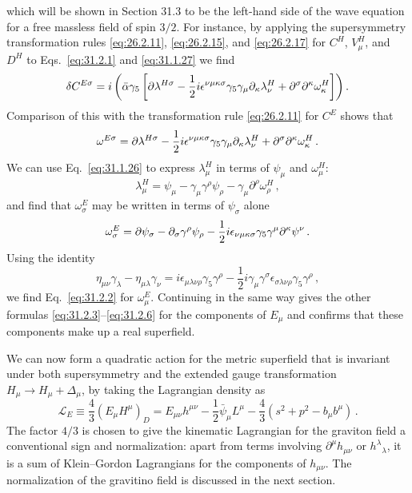 which will be shown in Section 31.3 to be the left-hand side of the wave
equation for a free massless field of spin \(3/2\). For instance, by applying
the supersymmetry transformation rules \eqref{eq:26.2.11},
\eqref{eq:26.2.15}, and \eqref{eq:26.2.17} for \(C^H\), \(V_\mu^H\), and
\(D^H\) to Eqs.~\eqref{eq:31.2.1} and \eqref{eq:31.1.27} we find
\[
  \delta C^{E\sigma}
  =i\left(
    \bar\alpha\gamma_5
    \left[
      \sl{\partial}\lambda^{H\sigma}
      -\frac12i\epsilon^{\nu\mu\kappa\sigma}
       \gamma_5\gamma_\mu\partial_\kappa\lambda_\nu^H
      +\partial^\sigma\partial^\kappa\omega_\kappa^H
    \right]
  \right).
\]
Comparison of this with the transformation rule \eqref{eq:26.2.11} for
\(C^E\) shows that
\[
  \omega^{E\sigma}
  =\sl{\partial}\lambda^{H\sigma}
   -\frac12i\epsilon^{\nu\mu\kappa\sigma}
    \gamma_5\gamma_\mu\partial_\kappa\lambda_\nu^H
   +\partial^\sigma\partial^\kappa\omega_\kappa^H\,.
\]
We can use Eq.~\eqref{eq:31.1.26} to express \(\lambda_\mu^H\) in terms of
\(\psi_\mu\) and \(\omega_\mu^H\):
\[
  \lambda_\mu^H
  =\psi_\mu-\gamma_\mu\gamma^\rho\psi_\rho
   -\gamma_\mu\partial^\rho\omega_\rho^H\,,
\]
and find that \(\omega_\sigma^E\) may be written in terms of \(\psi_\sigma\)
alone
\[
  \omega_\sigma^E
  =\sl{\partial}\psi_\sigma
   -\partial_\sigma\gamma^\rho\psi_\rho
   -\frac12i\epsilon_{\nu\mu\kappa\sigma}
    \gamma_5\gamma^\mu\partial^\kappa\psi^\nu\,.
\]
Using the identity
\[
  \eta_{\mu\nu}\gamma_\lambda-\eta_{\mu\lambda}\gamma_\nu
  =i\epsilon_{\mu\lambda\nu\rho}\gamma_5\gamma^\rho
   -\frac12i\gamma_\mu\gamma^\sigma
    \epsilon_{\sigma\lambda\nu\rho}\gamma_5\gamma^\rho\,,
\]
we find Eq.~\eqref{eq:31.2.2} for \(\omega_\mu^E\). Continuing in the same
way gives the other formulas \eqref{eq:31.2.3}--\eqref{eq:31.2.6} for the
components of \(E_\mu\) and confirms that these components make up a real
superfield.

We can now form a quadratic action for the metric superfield that is invariant
under both supersymmetry and the extended gauge transformation
\(H_\mu\to H_\mu+\Delta_\mu\), by taking the Lagrangian density as
\begin{equation}
  \mathcal L_E
  \equiv\frac43(E_\mu H^\mu)_D
  =E_{\mu\nu}h^{\mu\nu}
   -\frac12\bar\psi_\mu L^\mu
   -\frac43(s^2+p^2-b_\mu b^\mu)\,.
  \tag{31.2.9}\label{eq:31.2.9}
\end{equation}
The factor \(4/3\) is chosen to give the kinematic Lagrangian for the graviton
field a conventional sign and normalization: apart from terms involving
\(\partial^\mu h_{\mu\nu}\) or \(h^\lambda{}_\lambda\), it is a sum of
Klein--Gordon Lagrangians for the components of \(h_{\mu\nu}\). The
normalization of the gravitino field is discussed in the next section.

